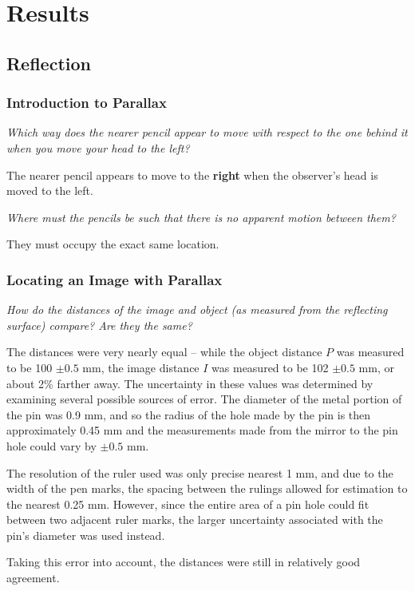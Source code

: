 \documentclass[twocolumn,english]{IEEEtran}
\theoremstyle{plain}
\theoremstyle{plain}
\begin{document}
\section{Results}
\subsection{\textbf{Reflection}}

\subsubsection{Introduction to Parallax}


\noindent\textit{Which way does the nearer pencil appear to move with respect to the one behind it when you move your head to the left?}

The nearer pencil appears to move to the \textbf{right} when the observer's head is moved to the left.

\noindent\textit{Where must the pencils be such that there is no apparent motion between them?}

They must occupy the exact same location.

\subsubsection{Locating an Image with Parallax}


\noindent\textit{How do the distances of the image and object (as measured from the reflecting surface) compare? Are they the same?}

The distances were very nearly equal -- while the object distance $P$ was measured to be 100 $\pm 0.5$ mm, the image distance $I$ was measured to be 102 $\pm 0.5$ mm, or about 2\% farther away. The uncertainty in these values was determined by examining several possible sources of error. The diameter of the metal portion of the pin was 0.9 mm, and so the radius of the hole made by the pin is then approximately 0.45 mm and the measurements made from the mirror to the pin hole could vary by $\pm 0.5$ mm.

The resolution of the ruler used was only precise nearest 1 mm, and due to the width of the pen marks, the spacing between the rulings allowed for estimation to the nearest 0.25 mm. However, since the entire area of a pin hole could fit between two adjacent ruler marks, the larger uncertainty associated with the pin's diameter was used instead.

Taking this error into account, the distances were still in relatively good agreement.
\end{document}

